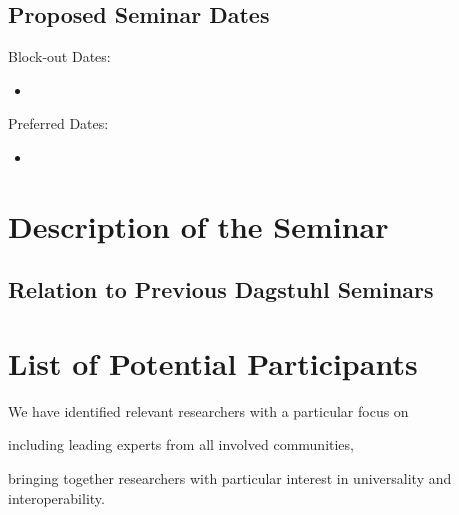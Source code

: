 \documentclass[a4paper,11pt]{article}
\begin{document}
\subsection{Proposed Seminar Dates}


Block-out Dates: 
\begin{itemize}
\item 
\end{itemize}

\noindent
Preferred Dates: 
 \begin{itemize}
 \item 
\end{itemize}

\section{Description of the Seminar}
  

\subsection{Relation to Previous Dagstuhl Seminars}


\section{List of Potential Participants}

We have identified  relevant researchers with a particular focus on
\begin{compactitem}
  \item including leading experts from all involved communities,
  \item bringing together researchers with particular interest in universality and interoperability.
\end{compactitem}
\medskip

\end{document}
